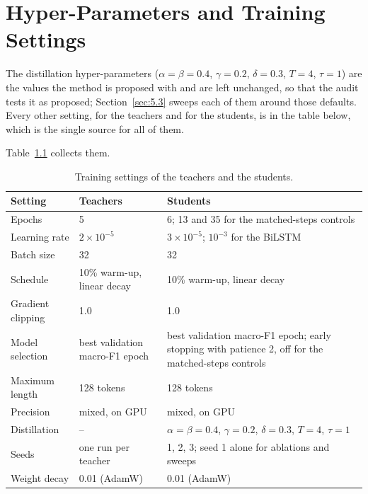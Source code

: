 
\chapter{Hyper-Parameters and Training Settings}
\label{app:hyper}
The distillation hyper-parameters ($\alpha = \beta = 0.4$, $\gamma = 0.2$, $\delta = 0.3$, $T = 4$,
$\tau = 1$) are the values the method is proposed with and are left unchanged, so that the audit
tests it as proposed; Section~\ref{sec:5.3} sweeps each of them around those defaults. Every other
setting, for the teachers and for the students, is in the table below, which is the single source
for all of them.

Table~\ref{tab:hyper} collects them.

\begin{table}[htbp]
\centering
\small
\caption{Training settings of the teachers and the students.}
\label{tab:hyper}
\begin{tabular}{p{3.6cm}p{4.2cm}p{5.8cm}}
\toprule
Setting & Teachers & Students \\
\midrule
Epochs & 5 & 6; 13 and 35 for the matched-steps controls \\
Learning rate & $2 \times 10^{-5}$ & $3 \times 10^{-5}$; $10^{-3}$ for the BiLSTM \\
Batch size & 32 & 32 \\
Schedule & 10\% warm-up, linear decay & 10\% warm-up, linear decay \\
Gradient clipping & 1.0 & 1.0 \\
Model selection & best validation macro-F1 epoch & best validation macro-F1 epoch; early stopping with patience 2, off for the matched-steps controls \\
Maximum length & 128 tokens & 128 tokens \\
Precision & mixed, on GPU & mixed, on GPU \\
Distillation & -- & $\alpha = \beta = 0.4$, $\gamma = 0.2$, $\delta = 0.3$, $T = 4$, $\tau = 1$ \\
Seeds & one run per teacher & 1, 2, 3; seed 1 alone for ablations and sweeps \\
Weight decay & 0.01 (AdamW) & 0.01 (AdamW) \\
\bottomrule
\end{tabular}
\end{table}
